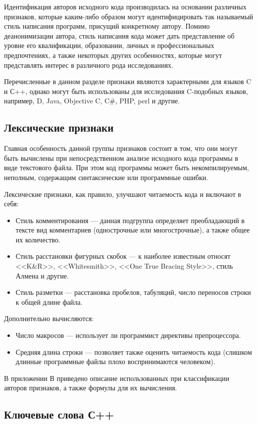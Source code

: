 Идентификация авторов исходного кода производилась на основании различных признаков, которые каким-либо 
образом могут идентифицировать так называемый стиль написания программ, присущий конкретному автору. 
Помимо деанонимизации автора, стиль написания кода может дать представление об уровне его квалификации, 
образовании, личных и профессиональных предпочтениях, а также некоторых других особенностях, которые могут 
представлять интерес в различного рода исследованиях. 

Перечисленные в данном разделе признаки являются характерными для языков C и С++, однако могут быть 
использованы для исследования C-подобных языков, например, D, Java, Objective C, C\#, PHP, perl и другие.

\subsection{Лексические признаки}

Главная особенность данной группы признаков состоит в том, что они могут быть вычислены при 
непосредственном анализе исходного кода программы в виде текстового файла. 
При этом код программы может быть некомпилируемым, неполным, содержащим
синтаксические или программные ошибки.

Лексические признаки, как правило, улучшают читаемость кода и включают в себя:

\begin{itemize}
 \item Стиль комментирования --- данная подгруппа определяет преобладающий в тексте вид комментариев 
 (однострочные или многострочные), а также общее их количество.
 \item Стиль расстановки фигурных скобок --- к наиболее известным относят <<K\&R>>, <<Whitesmith>>,
 <<One True Bracing Style>>, стиль Алмена и другие.~\cite{bracing_styles} 
 \item Стиль разметки --- расстановка пробелов, табуляций, число переносов строки к общей длине файла.
\end{itemize}


Дополнительно вычисляются:
\begin{itemize}
 \item Число макросов --- использует ли программист директивы препроцессора.\cite{macros}
 \item Средняя длина строки --- позволяет также оценить читаемость кода (слишком длинные программные файлы
 плохо воспринимаются человеком).
\end{itemize}


В приложении В приведено описание использованных при классификации авторов 
признаков, а также формулы для их вычисления.


\clearpage
\subsection{Ключевые слова С++}\label{keycpp}
